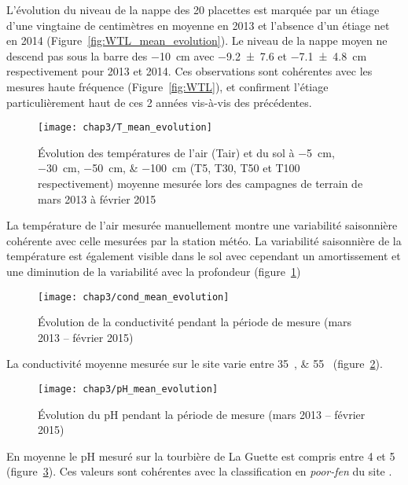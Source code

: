 L'évolution du niveau de la nappe des 20 placettes est marquée par un étiage d'une vingtaine de centimètres en moyenne en 2013 et l'absence d'un étiage net en 2014 (Figure~\ref{fig:WTL_mean_evolution}).
Le niveau de la nappe moyen ne descend pas sous la barre des \SI{-10}{\cm} avec \num{-9.2(76)} et \SI{-7.1(48)}{\centi\metre} respectivement pour 2013 et 2014.
Ces observations sont cohérentes avec les mesures haute fréquence (Figure~\ref{fig:WTL}), et confirment l'étiage particulièrement haut de ces 2 années vis-à-vis des précédentes.

\begin{figure}
\centering
\texttt{[image: chap3/T\_mean\_evolution]}
\caption{Évolution des températures de l'air (Tair) et du sol à \SIlist{-5;-30;-50;-100}{\centi\metre} (T5, T30, T50 et T100 respectivement) moyenne mesurée lors des campagnes de terrain de mars 2013 à février 2015}
\label{fig:T_mean_evolution}
\end{figure}

La température de l'air mesurée manuellement montre une variabilité saisonnière cohérente avec celle mesurées par la station météo. 
La variabilité saisonnière de la température est également visible dans le sol avec cependant un amortissement et une diminution de la variabilité avec la profondeur (figure~\ref{fig:T_mean_evolution})

\begin{figure}
\centering
\texttt{[image: chap3/cond\_mean\_evolution]}
\caption{Évolution de la conductivité pendant la période de mesure (mars 2013 -- février 2015)}
\label{fig:cond_mean_evolution}
\end{figure}

La conductivité moyenne mesurée sur le site varie entre \SIlist{35;55}{\usml} (figure~\ref{fig:cond_mean_evolution}).


\begin{figure}
\centering
\texttt{[image: chap3/pH\_mean\_evolution]}
\caption{Évolution du pH pendant la période de mesure (mars 2013 -- février 2015)}
\label{fig:pH_mean_evolution}
\end{figure}


En moyenne le pH mesuré sur la tourbière de La Guette est compris entre 4 et 5 (figure~\ref{fig:pH_mean_evolution}).
Ces valeurs sont cohérentes avec la classification en \textit{poor-fen} du site .


